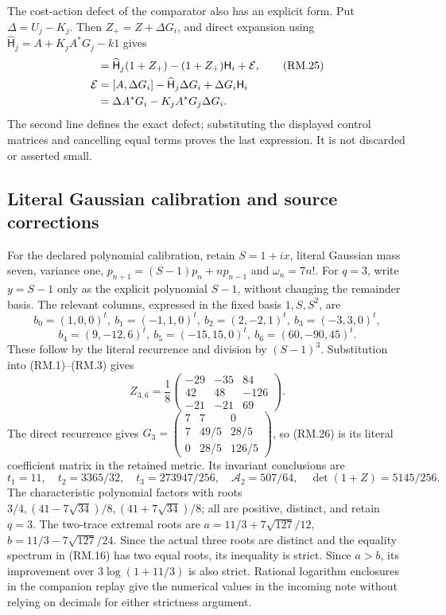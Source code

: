 The cost-action defect of the comparator also has an explicit form.
Put $\Delta=U_j-K_j$. Then
$Z_+=Z+\Delta G_i$, and direct expansion using
$\widehat{\mathsf H}_j=A+K_jA^*G_j-k1$ gives
\begin{align}
 [A,Z_+]&=\widehat{\mathsf H}_j(1+Z_+)
 -(1+Z_+)\mathsf H_i+\mathcal E,\tag{RM.25}\\
 \mathcal E&=[A,\Delta G_i]-\widehat{\mathsf H}_j\Delta G_i
 +\Delta G_i\mathsf H_i\notag\\
 &=\Delta A^*G_i-K_jA^*G_j\Delta G_i.\notag
\end{align}
The second line defines the exact defect; substituting the displayed
control matrices and cancelling equal terms proves the last expression.
It is not discarded or asserted small.

\subsection{Literal Gaussian calibration and source corrections}
For the declared polynomial calibration, retain $S=1+ix$, literal Gaussian
mass seven, variance one, $p_{n+1}=(S-1)p_n+np_{n-1}$ and $\omega_n=7n!$.
For $q=3$, write $y=S-1$ only as the explicit polynomial $S-1$, without
changing the remainder basis. The relevant columns, expressed in the fixed
basis $1,S,S^2$, are
\[
 b_0=(1,0,0)^t,\ b_1=(-1,1,0)^t,\ b_2=(2,-2,1)^t,
 \ b_3=(-3,3,0)^t,
\]
\[
 b_4=(9,-12,6)^t,\ b_5=(-15,15,0)^t,
 \ b_6=(60,-90,45)^t.
\]
These follow by the literal recurrence and division by $(S-1)^3$.
Substitution into (RM.1)--(RM.3) gives
\begin{equation}
 Z_{3,6}=\frac1{8}
 \begin{pmatrix}-29&-35&84\\42&48&-126\\-21&-21&69\end{pmatrix}.
 \tag{RM.26}
\end{equation}
The direct recurrence gives
$G_3=\left(\begin{smallmatrix}7&7&0\\7&49/5&28/5\\0&28/5&126/5\end{smallmatrix}\right)$,
so (RM.26) is its literal coefficient matrix in the retained metric.
Its invariant conclusions are
\begin{equation}
 t_1=11,\quad t_2=3365/32,\quad t_3=273947/256,\quad
 \mathcal A_2=507/64,\quad\det(1+Z)=5145/256.\tag{RM.27}
\end{equation}
The characteristic polynomial factors with roots
$3/4,(41-7\sqrt{34})/8,(41+7\sqrt{34})/8$; all are positive, distinct,
and retain $q=3$. The two-trace extremal roots are
$a=11/3+7\sqrt{127}/12$, $b=11/3-7\sqrt{127}/24$.
Since the actual three roots are distinct and the equality spectrum in
(RM.16) has two equal roots, its inequality is strict. Since $a>b$, its
improvement over $3\log(1+11/3)$ is also strict. Rational logarithm
enclosures in the companion replay give the numerical values in the incoming
note without relying on decimals for either strictness argument.

